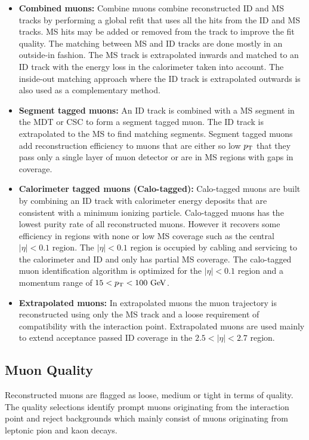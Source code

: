 \begin{itemize}
\item[] {\bf Combined muons:}  Combine muons combine reconstructed ID and MS tracks by performing a global refit that uses all the hits from the ID and MS tracks.  MS hits may be added or removed from the track to improve the fit quality.  The matching between MS and ID tracks are done mostly in an outside-in fashion.  The MS track is extrapolated inwards and matched to an ID track with the energy loss in the calorimeter taken into account.  The inside-out matching approach where the ID track is extrapolated outwards is also used as a complementary method. 
\item[] {\bf Segment tagged muons:}  An ID track is combined with a MS segment in the MDT or CSC to form a segment tagged muon.  The ID track is extrapolated to the MS to find matching segments.  Segment tagged muons add reconstruction efficiency to muons that are either so low $p_{\mathrm{T}}$ that they pass only a single layer of muon detector or are in MS regions with gaps in coverage. 
\item[] {\bf Calorimeter tagged muons (Calo-tagged):}  Calo-tagged muons are built by combining an ID track with calorimeter energy deposits that are consistent with a minimum ionizing particle.  Calo-tagged muons has the lowest purity rate of all reconstructed muons.  However it recovers some efficiency in regions with none or low MS coverage such as the central $|\eta| < 0.1$ region.  The $|\eta| < 0.1$ region is occupied by cabling and servicing to the calorimeter and ID and only has partial MS coverage.  The calo-tagged muon identification algorithm is optimized for the $|\eta| < 0.1$ region and a momentum range of $15 < \pt < 100 \gev$.
\item[] {\bf Extrapolated muons:}  In extrapolated muons the muon trajectory is reconstructed using only the MS track and a loose requirement of compatibility with the interaction point.  Extrapolated muons are used mainly to extend acceptance passed ID coverage in the $2.5 < |\eta| < 2.7$ region.
\end{itemize}

\subsection{Muon Quality}
\label{sec:reco:MuonQuality}

\indent Reconstructed muons are flagged as loose, medium or tight in terms of quality.  The quality selections identify prompt muons originating from the interaction point and reject backgrounds which mainly consist of muons originating from leptonic pion and kaon decays. \\

